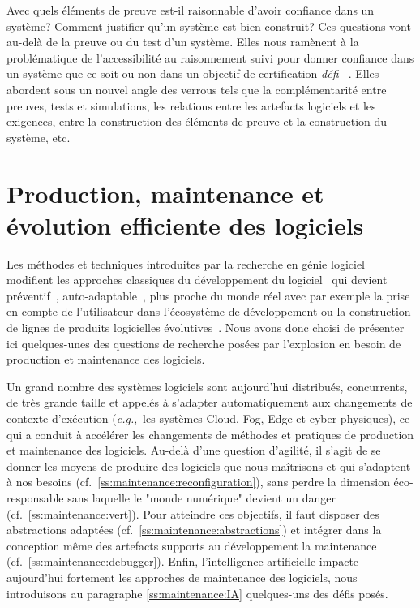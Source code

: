 \documentclass[11pt]{article}
\newcommand{\eg}[0]{\emph{e.g.},~}
\newcommand{\cf}[0]{cf.~}
\newcommand{\defi}[1]{\emph{défi~%
\cite{#1}}}
\begin{document}
Avec quels éléments de preuve est-il raisonnable d'avoir confiance dans un système? Comment justifier qu'un système est bien construit? Ces questions vont au-delà de la preuve ou du test d'un système. Elles nous ramènent à  la problématique de l'accessibilité au raisonnement suivi pour donner confiance dans un système que ce soit ou non dans un objectif de certification \defi{argumentation}.  Elles abordent sous un nouvel angle des verrous tels que la 
complémentarité entre preuves, tests et simulations, les relations entre les artefacts logiciels et les exigences, entre la construction des éléments de preuve et la construction du système, etc. 

\section{Production, maintenance et évolution efficiente des logiciels \label{s:maintenance}}
Les méthodes et techniques introduites par la recherche en génie logiciel modifient les approches classiques du développement du logiciel~\cite{Broy18} qui devient préventif~\cite{Hamilton18}, auto-adaptable~\cite{Chandra2020, murphy19}, plus proche du monde réel avec par exemple la prise en compte de l’utilisateur dans l’écosystème de développement ou la construction de lignes de produits logicielles évolutives~\cite{Marques2019}. Nous avons donc choisi de présenter ici quelques-unes des questions de recherche posées par l'explosion en besoin de production et maintenance des logiciels.


Un grand nombre des systèmes logiciels sont aujourd'hui distribués, concurrents, de très grande taille et appelés à s'adapter automatiquement aux changements de contexte d'exécution (\eg les systèmes Cloud, Fog, Edge et cyber-physiques), ce qui a conduit à accélérer les changements de méthodes et pratiques de production et maintenance des logiciels.   Au-delà d'une question d'agilité, il s'agit de se donner les moyens de produire des logiciels que nous maîtrisons 
et qui s'adaptent à nos besoins (\cf\ref{ss:maintenance:reconfiguration}), sans perdre la dimension éco-responsable sans laquelle le "monde numérique" devient un danger (\cf\ref{ss:maintenance:vert}). Pour atteindre ces objectifs, il faut disposer des abstractions adaptées (\cf\ref{ss:maintenance:abstractions}) et intégrer dans la conception même des artefacts supports au développement la maintenance (\cf\ref{ss:maintenance:debugger}). Enfin, l'intelligence artificielle impacte aujourd'hui fortement les approches de maintenance des logiciels, nous introduisons au paragraphe \ref{ss:maintenance:IA} quelques-uns des défis posés.
\end{document}
